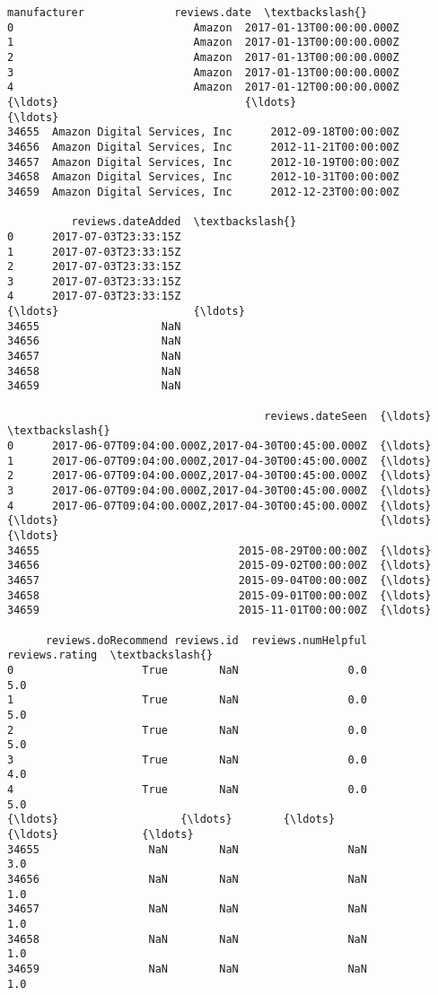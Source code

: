 \documentclass[11pt]{article}
\begin{document}
\begin{Verbatim}[commandchars=\\\{\}]
                       manufacturer              reviews.date  \textbackslash{}
0                            Amazon  2017-01-13T00:00:00.000Z
1                            Amazon  2017-01-13T00:00:00.000Z
2                            Amazon  2017-01-13T00:00:00.000Z
3                            Amazon  2017-01-13T00:00:00.000Z
4                            Amazon  2017-01-12T00:00:00.000Z
{\ldots}                             {\ldots}                       {\ldots}
34655  Amazon Digital Services, Inc      2012-09-18T00:00:00Z
34656  Amazon Digital Services, Inc      2012-11-21T00:00:00Z
34657  Amazon Digital Services, Inc      2012-10-19T00:00:00Z
34658  Amazon Digital Services, Inc      2012-10-31T00:00:00Z
34659  Amazon Digital Services, Inc      2012-12-23T00:00:00Z

          reviews.dateAdded  \textbackslash{}
0      2017-07-03T23:33:15Z
1      2017-07-03T23:33:15Z
2      2017-07-03T23:33:15Z
3      2017-07-03T23:33:15Z
4      2017-07-03T23:33:15Z
{\ldots}                     {\ldots}
34655                   NaN
34656                   NaN
34657                   NaN
34658                   NaN
34659                   NaN

                                        reviews.dateSeen  {\ldots}  \textbackslash{}
0      2017-06-07T09:04:00.000Z,2017-04-30T00:45:00.000Z  {\ldots}
1      2017-06-07T09:04:00.000Z,2017-04-30T00:45:00.000Z  {\ldots}
2      2017-06-07T09:04:00.000Z,2017-04-30T00:45:00.000Z  {\ldots}
3      2017-06-07T09:04:00.000Z,2017-04-30T00:45:00.000Z  {\ldots}
4      2017-06-07T09:04:00.000Z,2017-04-30T00:45:00.000Z  {\ldots}
{\ldots}                                                  {\ldots}  {\ldots}
34655                               2015-08-29T00:00:00Z  {\ldots}
34656                               2015-09-02T00:00:00Z  {\ldots}
34657                               2015-09-04T00:00:00Z  {\ldots}
34658                               2015-09-01T00:00:00Z  {\ldots}
34659                               2015-11-01T00:00:00Z  {\ldots}

      reviews.doRecommend reviews.id  reviews.numHelpful  reviews.rating  \textbackslash{}
0                    True        NaN                 0.0             5.0
1                    True        NaN                 0.0             5.0
2                    True        NaN                 0.0             5.0
3                    True        NaN                 0.0             4.0
4                    True        NaN                 0.0             5.0
{\ldots}                   {\ldots}        {\ldots}                 {\ldots}             {\ldots}
34655                 NaN        NaN                 NaN             3.0
34656                 NaN        NaN                 NaN             1.0
34657                 NaN        NaN                 NaN             1.0
34658                 NaN        NaN                 NaN             1.0
34659                 NaN        NaN                 NaN             1.0


\end{Verbatim}
\end{document}
